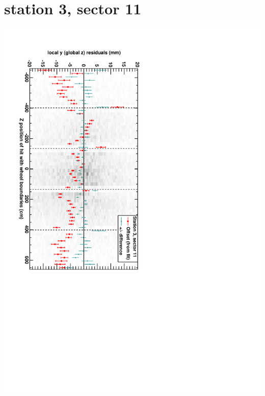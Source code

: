 \documentclass[compress]{beamer}
\begin{document}
\section*{station 3, sector 11}
\begin{frame} \vfill \mbox{\hspace{-1 cm}\includegraphics[height=1.2\linewidth, angle=90]{DTzVsZ_st3_sr11.pdf}} \end{frame}
\end{document}
